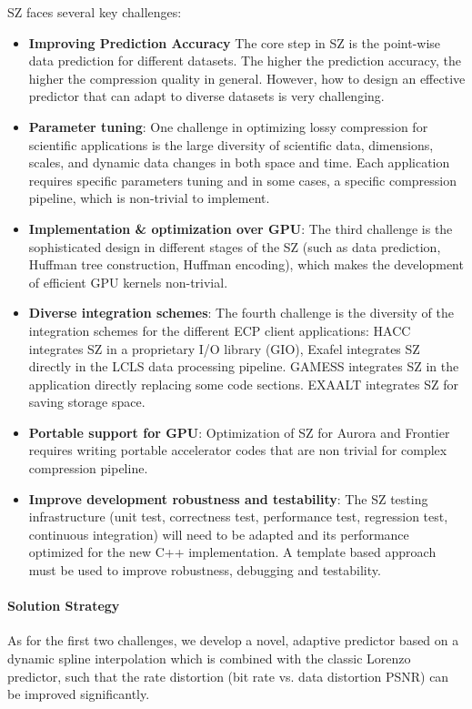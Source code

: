 SZ faces several key challenges:
\begin{itemize}
\item \textbf{Improving Prediction Accuracy} The core step in SZ is the point-wise data prediction for different datasets. The higher the prediction accuracy, the higher the compression quality in general. However, how to design an effective predictor that can adapt to diverse datasets is very challenging.
\item \textbf{Parameter tuning}: One challenge in optimizing lossy compression for scientific applications is the large
diversity of scientific data, dimensions, scales, and dynamic data changes in both space and time. Each application requires specific parameters tuning and in some cases, a specific compression pipeline, which is non-trivial to implement.
\item \textbf{Implementation \& optimization over GPU}: The third challenge is the sophisticated design in different stages of the SZ (such as data prediction, Huffman tree construction, Huffman encoding), which makes the development of efficient GPU kernels non-trivial. 
\item \textbf{Diverse integration schemes}: The fourth challenge is the diversity of the integration schemes for the different ECP client applications: HACC integrates SZ in a proprietary I/O library (GIO), Exafel integrates SZ directly in the LCLS data processing pipeline. GAMESS integrates SZ in the application directly replacing some code sections. EXAALT integrates SZ for saving storage space.
\item \textbf{Portable support for GPU}: Optimization of SZ for Aurora and Frontier requires writing portable accelerator codes that are non trivial for complex compression pipeline. 
\item \textbf{Improve development robustness and testability}: The SZ testing infrastructure (unit test, correctness test, performance test, regression test, continuous integration) will need to be adapted and its performance optimized for the new C++ implementation. A template based approach must be used to improve robustness, debugging and testability.
\end{itemize}

\paragraph{Solution Strategy}

As for the first two challenges, we develop a novel, adaptive predictor based on a dynamic spline interpolation which is combined with the classic Lorenzo predictor, such that the rate distortion (bit rate vs. data distortion PSNR) can be improved significantly.

